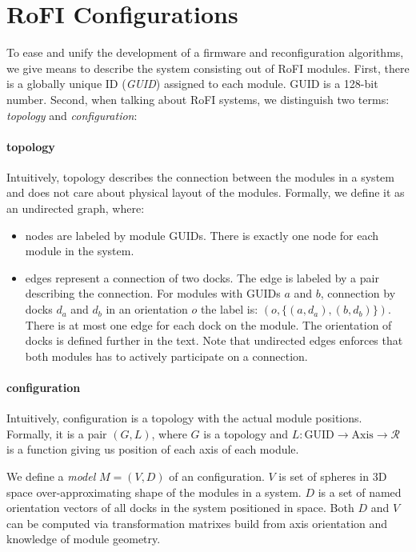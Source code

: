 

\section{RoFI Configurations} \label{sec:configuration}

To ease and unify the development of a firmware and reconfiguration algorithms,
we give means to describe the system consisting out of RoFI modules. First,
there is a globally unique ID (\emph{GUID}) assigned to each module. GUID is a
128-bit number. Second, when talking about RoFI systems, we distinguish two
terms: \emph{topology} and \emph{configuration}:

\paragraph{topology} Intuitively, topology describes the connection between the
modules in a system and does not care about physical layout of the modules.
Formally, we define it as an undirected graph, where:
\begin{itemize}
    \item nodes are labeled by module GUIDs. There is exactly one node for each
    module in the system.
    \item edges represent a connection of two docks. The edge is labeled by a
    pair describing the connection. For modules with GUIDs $a$ and $b$,
    connection by docks $d_a$ and $d_b$ in an orientation $o$ the label is: $(o,
    \{(a, d_a), (b, d_b)\})$. There is at most one edge for each dock on the
    module. The orientation of docks is defined further in the text. Note that
    undirected edges enforces that both modules has to actively participate on a
    connection.
\end{itemize}

\paragraph{configuration} Intuitively, configuration is a topology with the
actual module positions. Formally, it is a pair $(G, L)$, where $G$ is a
topology and $L: \text{GUID} \rightarrow \text{Axis} \rightarrow \mathcal{R}$ is
a function giving us position of each axis of each module.

We define a \emph{model} $M = (V, D)$ of an configuration. $V$ is set of spheres
in 3D space over-approximating shape of the modules in a system. $D$ is a set of
named orientation vectors of all docks in the system positioned in space. Both
$D$ and $V$ can be computed via transformation matrixes build from axis
orientation and knowledge of module geometry.


